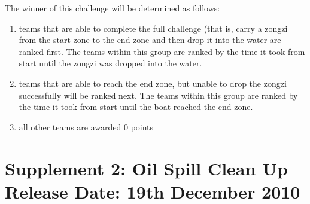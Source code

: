 \documentclass[12pt]{hurocup}
\begin{document}

\begin{lawlist}[DBC]

\item \label{dbc-winner} The winner of this challenge will be
  determined as follows:
  \begin{enumerate}
    \item teams that are able to complete the full challenge (that is,
      carry a zongzi from the start zone to the end zone and then drop
      it into the water are ranked first. The teams within this group
      are ranked by the time it took from start until the zongzi was
      dropped into the water.
    \item teams that are able to reach the end zone, but unable to
      drop the zongzi successfully will be ranked next. The teams
      within this group are ranked by the time it took from start
      until the boat reached the end zone.
    \item all other teams are awarded 0 points
  \end{enumerate}

\end{lawlist}

\section{Supplement 2: Oil Spill Clean Up\\Release Date: 19th December 2010}
\label{sec:supp-oil-spill-clean-up}
\end{document}
